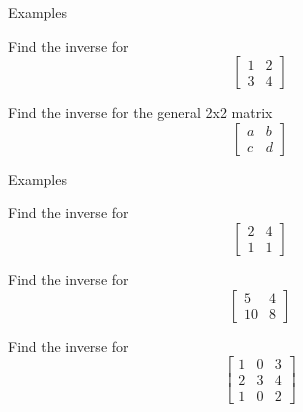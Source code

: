 \documentclass{beamer}
\begin{document}
\begin{frame}{Examples}
  \begin{example}
    Find the inverse for
    \begin{equation*}
      \left[
        \begin{array}{cc}
          1&2\\
          3&4
        \end{array}
      \right]
    \end{equation*}
  \end{example}
  \begin{example}
    Find the inverse for the general 2x2 matrix
    \begin{equation*}
      \left[
        \begin{array}{cc}
          a&b\\
          c&d
        \end{array}
      \right]
    \end{equation*}
  \end{example}
\end{frame}

\begin{frame}{Examples}
  \begin{example}
    Find the inverse for
    \begin{equation*}
      \left[
        \begin{array}{cc}
          2&4\\
          1&1
        \end{array}
      \right]
    \end{equation*}
  \end{example}
  \begin{example}
    Find the inverse for
    \begin{equation*}
      \left[
        \begin{array}{cc}
          5&4\\
          10&8
        \end{array}
      \right]
    \end{equation*}
  \end{example}
  \begin{example}
    Find the inverse for
    \begin{equation*}
      \left[
        \begin{array}{ccc}
          1&0&3\\
          2&3&4\\
          1&0&2
        \end{array}
      \right]
    \end{equation*}
  \end{example}

\end{frame}
\end{document}
